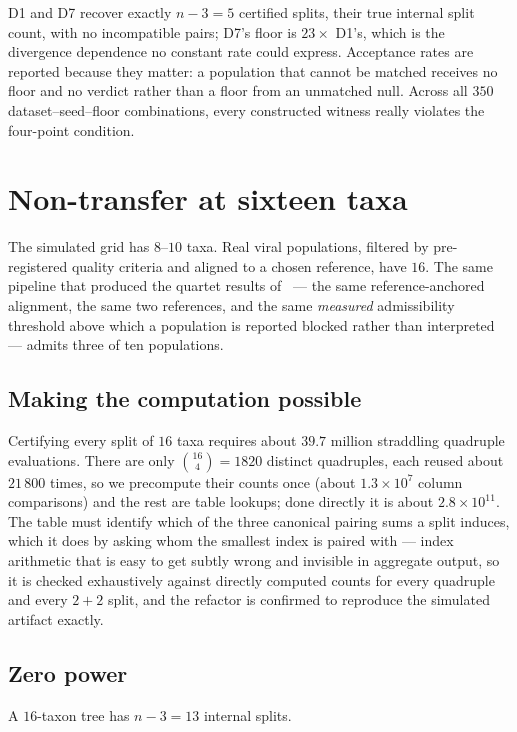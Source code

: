\documentclass[11pt,a4paper]{article}
\theoremstyle{definition}
\theoremstyle{remark}
\begin{document}
D1 and D7 recover exactly $n-3 = 5$ certified splits, their true internal split
count, with no incompatible pairs; D7's floor is $23\times$ D1's, which is the
divergence dependence no constant rate could express. Acceptance rates are
reported because they matter: a population that cannot be matched receives no
floor and no verdict rather than a floor from an unmatched null. Across all
$350$ dataset--seed--floor combinations, every constructed witness really
violates the four-point condition.

\section{Non-transfer at sixteen taxa}\label{sec:nontransfer}

The simulated grid has $8$--$10$ taxa. Real viral populations, filtered by
pre-registered quality criteria and aligned to a chosen reference, have $16$. The
same pipeline that produced the quartet results of~\cite{paperf} --- the same
reference-anchored alignment, the same two references, and the same
\emph{measured} admissibility threshold above which a population is reported
blocked rather than interpreted --- admits three of ten populations.

\subsection{Making the computation possible}

Certifying every split of $16$ taxa requires about $39.7$ million straddling
quadruple evaluations. There are only $\binom{16}{4} = 1820$ distinct quadruples,
each reused about $21\,800$ times, so we precompute their counts once (about
$1.3 \times 10^7$ column comparisons) and the rest are table lookups; done
directly it is about $2.8 \times 10^{11}$. The table must identify which of the
three canonical pairing sums a split induces, which it does by asking whom the
smallest index is paired with --- index arithmetic that is easy to get subtly
wrong and invisible in aggregate output, so it is checked exhaustively against
directly computed counts for every quadruple and every $2{+}2$ split, and the
refactor is confirmed to reproduce the simulated artifact exactly.

\subsection{Zero power}

A $16$-taxon tree has $n - 3 = 13$ internal splits.
\end{document}
